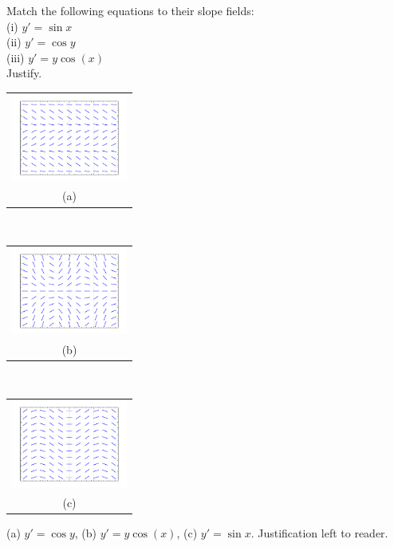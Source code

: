 {Match the following equations to their slope fields:\\
(i) $y'=\sin x$\\
(ii) $y'=\cos y$\\
(iii) $y' = y\cos(x)$ \\
Justify.

\medskip

\begin{tabular}{c}
\includegraphics[width=1.5in]{figures/yprimecosyslope}\\
(a)
\end{tabular}\\
\begin{tabular}{c}
\includegraphics[width=1.5in]{figures/yprimecosxyslope}\\
(b)
\end{tabular}\\
\begin{tabular}{c}
\includegraphics[width=1.5in]{figures/yprimesinxslope}\\
(c)
\end{tabular}
}
{(a) $y'=\cos y$,
(b) $y' = y\cos(x)$,
(c) $y'=\sin x$.
Justification left to reader.}